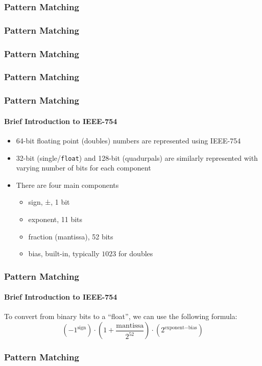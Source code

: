 \documentclass[english]{beamer}
\begin{document}
\begin{frame}[fragile]
\frametitle{Pattern Matching}

\end{frame}

\begin{frame}[fragile]
\frametitle{Pattern Matching}

\end{frame}

\begin{frame}[fragile]
\frametitle{Pattern Matching}

\end{frame}

\begin{frame}[fragile]
\frametitle{Pattern Matching}

\end{frame}

\begin{frame}
\frametitle{Pattern Matching}
\framesubtitle{Brief Introduction to IEEE-754}
\begin{itemize}
\item{64-bit floating point (doubles) numbers are represented using IEEE-754}
\item{32-bit (single/\texttt{float}) and 128-bit (quadurpals) are similarly
represented with varying number of bits for each component}
\item{There are four main components}
\begin{itemize}
\item{sign, ±, 1 bit}
\item{exponent, 11 bits}
\item{fraction (mantissa), 52 bits}
\item{bias, built-in, typically $1023$ for doubles}
\end{itemize}
\end{itemize}
\end{frame}

\begin{frame}
\frametitle{Pattern Matching}
\framesubtitle{Brief Introduction to IEEE-754}
To convert from binary bits to a ``float'', we can use the following formula:
$$
\left({}{-1}^{\text{sign}}\right){} \cdot{}
\left({}
1 + \frac{\text{mantissa}}{2^{52}}
\right){}
\cdot{} \left({}2^{\text{exponent} - \text{bias}}\right){}
$$
\end{frame}

\begin{frame}[fragile]
\frametitle{Pattern Matching}

\end{frame}
\end{document}
